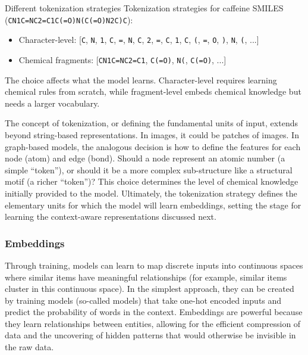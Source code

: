 \begin{examplebox}[label={example:tokenization}]{Different tokenization strategies}
Tokenization strategies for caffeine SMILES (\texttt{CN1C=NC2=C1C(=O)N(C(=O)N2C)C}):
\begin{itemize}
    \item Character-level: [\texttt{C}, \texttt{N}, \texttt{1}, \texttt{C}, \texttt{=}, \texttt{N}, \texttt{C}, \texttt{2}, \texttt{=}, \texttt{C}, \texttt{1}, \texttt{C}, \texttt{(}, \texttt{=}, \texttt{O}, \texttt{)}, \texttt{N}, \texttt{(}, ...]
    \item Chemical fragments: [\texttt{CN1C=NC2=C1}, \texttt{C(=O)}, \texttt{N(}, \texttt{C(=O)}, ...]
\end{itemize}

The choice affects what the model learns. Character-level requires learning chemical rules from scratch, while fragment-level embeds chemical knowledge but needs a larger vocabulary.
\end{examplebox}

The concept of tokenization, or defining the fundamental units of input, extends beyond string-based representations. 
In images, it could be patches of images. 
In graph-based models, the analogous decision is how to define the features for each node (atom) and edge (bond). 
Should a node represent an atomic number (a simple \enquote{token}), or should it be a more complex sub-structure like a structural motif\autocite{bouritsas2022improving} (a richer \enquote{token})? This choice determines the level of chemical knowledge initially provided to the model. 
Ultimately, the tokenization strategy defines the elementary units for which the model will learn embeddings, setting the stage for learning the context-aware representations discussed next.


\subsubsection{Embeddings} \label{sec:embeddings}

Through training, models can learn to map discrete inputs into continuous spaces where similar items have meaningful relationships (for example, similar items cluster in this continuous space). 
In the simplest approach, they can be created by training models (so-called  models) that take one-hot encoded inputs and predict the probability of words in the context.\autocite{mikolov2013efficient, mikolov2013distributed, Tshitoyan_2019}
Embeddings are powerful because they learn relationships between entities, allowing for the efficient compression of data and the uncovering of hidden patterns that would otherwise be invisible in the raw data.

